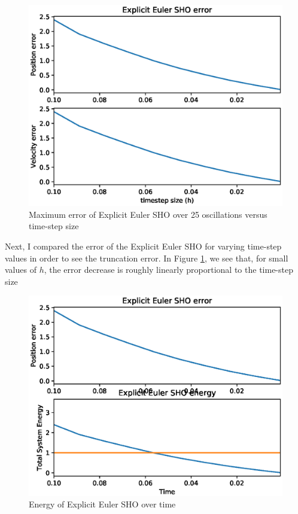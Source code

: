 \documentclass{article}
\begin{document}
\begin{figure}[h!]
\centering
\includegraphics[scale=0.75]{fig/explicit_error_vs_h.eps}
\caption{Maximum error of Explicit Euler SHO over 25 oscillations versus time-step size}
\label{fig:exp_error_h}
\end{figure}

Next, I compared the error of the Explicit Euler SHO for varying time-step values in order to see the truncation error.  In Figure \ref{fig:exp_error_h}, we see that, for small values of $h$, the error decrease is roughly linearly proportional to the time-step size

\newpage

\begin{figure}[h!]
\centering
\includegraphics[scale=0.75]{fig/explicit_energy.eps}
\caption{Energy of Explicit Euler SHO over time}
\label{fig:exp_energy}
\end{figure}
\end{document}
